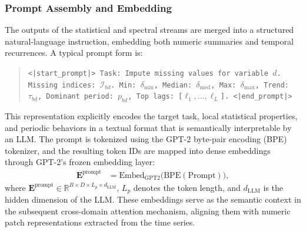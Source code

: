\documentclass[conference]{IEEEtran}
\begin{document}
\subsubsection{Prompt Assembly and Embedding}
The outputs of the statistical and spectral streams are merged into a structured natural-language instruction, embedding both numeric summaries and temporal recurrences. A typical prompt form is:
\begin{quote}
\small
\texttt{<|start\_prompt|> Task: Impute missing values for variable $d$. Missing indices: $\mathcal{I}_{bd}$. Min: $\delta_{\min}$, Median: $\delta_{\mathrm{med}}$, Max: $\delta_{\max}$, Trend: $\tau_{bd}$, Dominant period: $p_{bd}$, Top lags: [$\ell_1, \ldots, \ell_L$]. <|end\_prompt|>}
\end{quote}
This representation explicitly encodes the target task, local statistical properties,
and periodic behaviors in a textual format that is semantically interpretable by an LLM.
The prompt is tokenized using the GPT-2 byte-pair encoding (BPE) tokenizer, and the resulting
token IDs are mapped into dense embeddings through GPT-2's frozen embedding layer:
\begin{align}
\mathbf{E}^{\mathrm{prompt}} &= \mathrm{Embed}_{\mathrm{GPT2}}\big(\mathrm{BPE}(\text{Prompt})\big),
\label{eq:prompt-e}
\end{align}
where $\mathbf{E}^{\mathrm{prompt}} \in \mathbb{R}^{B \times D \times L_p \times d_{\mathrm{LLM}}}$,
$L_p$ denotes the token length, and $d_{\mathrm{LLM}}$ is the hidden dimension of the LLM.
These embeddings serve as the semantic context in the subsequent cross-domain attention mechanism,
aligning them with numeric patch representations extracted from the time series.
\end{document}
